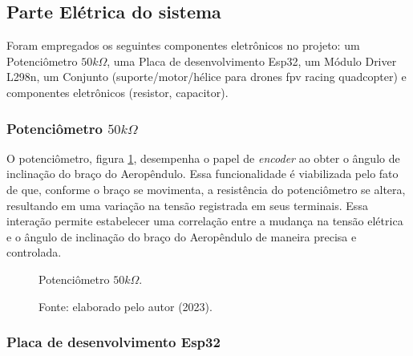 \subsection{Parte Elétrica do sistema}

Foram empregados os seguintes componentes eletrônicos no projeto: um Potenciômetro $50k\Omega$, uma Placa de desenvolvimento Esp32, um Módulo Driver L298n, um Conjunto (suporte/motor/hélice para drones fpv racing quadcopter) e componentes eletrônicos (resistor, capacitor).

\subsubsection{Potenciômetro $50k\Omega$}

O potenciômetro, figura \ref{fig3:image_04}, desempenha o papel de \textit{encoder} ao obter o ângulo de inclinação do braço do Aeropêndulo. Essa funcionalidade é viabilizada pelo fato de que, conforme o braço se movimenta, a resistência do potenciômetro se altera, resultando em uma variação na tensão registrada em seus terminais. Essa interação permite estabelecer uma correlação entre a mudança na tensão elétrica e o ângulo de inclinação do braço do Aeropêndulo de maneira precisa e controlada.

\begin{figure}[!h]
	\centering
	\caption{Potenciômetro $50k\Omega$.}
	\caption*{Fonte: elaborado pelo autor (2023).}
	\label{fig3:image_04}
\end{figure}




\subsubsection{Placa de desenvolvimento Esp32}


